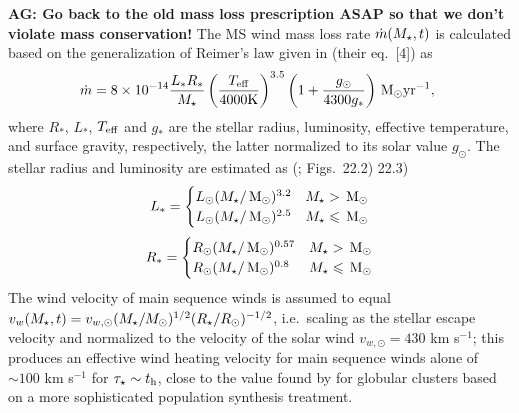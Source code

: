 {\bf AG: Go back to the old mass loss prescription ASAP so that we don't
  violate mass conservation!}
The MS wind mass loss rate $\dot{m}(M_{\star}, t)$ is calculated based on
the generalization of Reimer's law given in
\citet{SchroderCuntz:2005a} (their eq.~[4]) as
\begin{align}
  \dot{m}=8 \times 10^{-14} \frac{L_* R_*}{M_{\star}}
  \left(\frac{T_{\rm eff}}{\rm 4000 K}\right)^{3.5}
  \left(1+\frac{g_{\odot}}{4300 g_*}\right) \,{\rm M_\odot} {\rm yr}^{-1},\
\end{align}
where  $R_*$, $L_*$, $T_{\rm eff}$ and $g_*$ are the stellar radius,
luminosity, effective temperature, and surface gravity, respectively, the latter normalized to its solar value $g_{\odot}$.  The stellar radius and luminosity are estimated as (\citet{Kippenhahn&Weigert90}; Figs.~22.2) 22.3)
\begin{align}
L_*=
\begin{cases}
L_{\odot} (M_{\star}/\,{\rm M_\odot})^{3.2} & M_{\star} > \,{\rm M_\odot} \\
L_{\odot} (M_{\star}/\,{\rm M_\odot})^{2.5} & M_{\star} \leqslant \,{\rm M_\odot}
\end{cases}
\end{align}
\begin{align}
R_*=
\begin{cases}
R_{\odot} (M_{\star}/\,{\rm M_\odot})^{0.57} & M_{\star} > \,{\rm M_\odot} \\
R_{\odot} (M_{\star}/\,{\rm M_\odot})^{0.8} & M_{\star} \leqslant \,{\rm M_\odot}
\end{cases}
\end{align}
The wind velocity of main sequence winds is assumed
to equal $v_w (M_{\star}, t) = v_{w,\odot}(M_{\star}/M_{\odot})^{1/2}(R_{\star}/R_{\odot})^{-1/2}$, i.e.~scaling as the stellar escape velocity and normalized to the velocity of the solar wind $v_{w,\odot} = 430$ km s$^{-1}$; this produces an effective wind heating velocity for main
sequence winds alone of $\sim 100$ km s$^{-1}$ for $\tau_{\star} \sim t_{\rm h}$, close to the value found by \citet{NaimanSoares-Furtado+:2013a} for globular clusters based on a more
sophisticated population synthesis treatment. 

